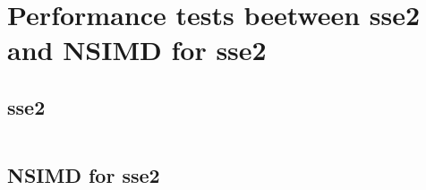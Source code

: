 \documentclass[12pt,a4paper,french]{article}
\begin{document}
\maketitle
\section{Performance tests beetween sse2 and NSIMD for sse2}
\subsection{sse2}
\begin{lstlisting}[frame=single]

\end{lstlisting}
\subsection{NSIMD for sse2}
\begin{lstlisting}[frame=single]

\end{lstlisting}
\end{document}

